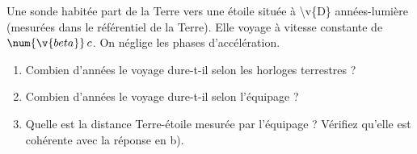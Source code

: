 Une sonde habitée part de la Terre vers une étoile située à \num{\v{D}} années-lumière (mesurées dans le référentiel de la Terre). Elle voyage à vitesse constante de $\num{\v{beta}}\,c$. On néglige les phases d'accélération.

\begin{enumerate}[label=\alph*)]
    \item Combien d'années le voyage dure-t-il selon les horloges terrestres ?
    \item Combien d'années le voyage dure-t-il selon l'équipage ?
    \item Quelle est la distance Terre-étoile mesurée par l'équipage ? Vérifiez qu'elle est cohérente avec la réponse en b).
\end{enumerate}
